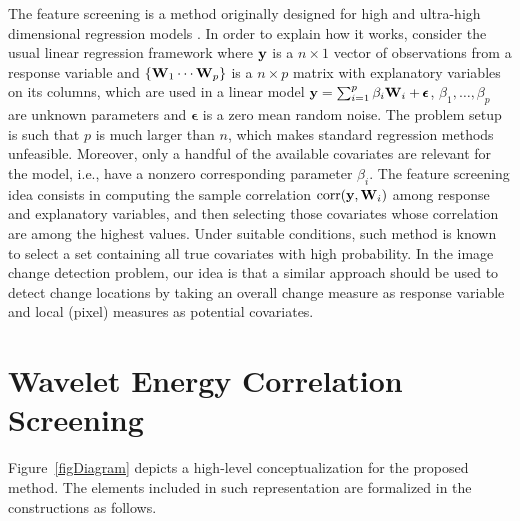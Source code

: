 \documentclass[journal]{IEEEtran}
\newcommand{\vepsilon}{\pmb{\epsilon}}
\newcommand{\vW}{{\textbf W}}
\newcommand{\vy}{{\textbf y}}
\begin{document}
The feature screening is a method originally designed for high and ultra-high dimensional regression models \cite{fan2008sure}. In order to explain how it works, consider the usual linear regression framework where $\vy$ is a $n\times 1$ vector of observations from a response variable and $\{\vW_1 \cdots \vW_p\}$ is a $n\times p$ matrix with explanatory variables on its columns, which are used in a linear model $\vy = \sum_{i=1}^{p}\beta_i\vW_i + \vepsilon$, $\beta_1,\ldots,\beta_p$ are unknown parameters and $\vepsilon$ is a zero mean random noise. The problem setup is such that $p$ is much larger than $n$, which makes standard regression methods unfeasible. Moreover, only a handful of the available covariates are relevant for the model, i.e., have a nonzero corresponding parameter $\beta_i$. The feature screening idea consists in computing the sample correlation $\mathrm{corr}(\vy,\vW_i)$ among response and explanatory variables, and then selecting those covariates whose correlation are among the highest values. Under suitable conditions, such method is known to select a set containing all true covariates with high probability. In the image change detection problem, our idea is that a similar approach should be used to detect change locations by taking an overall change measure as response variable and local (pixel) measures as potential covariates.



\section{Wavelet Energy Correlation Screening}\label{section_method}


Figure~\ref{figDiagram} depicts a high-level conceptualization for the proposed method. The elements included in such representation are formalized in the constructions as follows.
\end{document}

